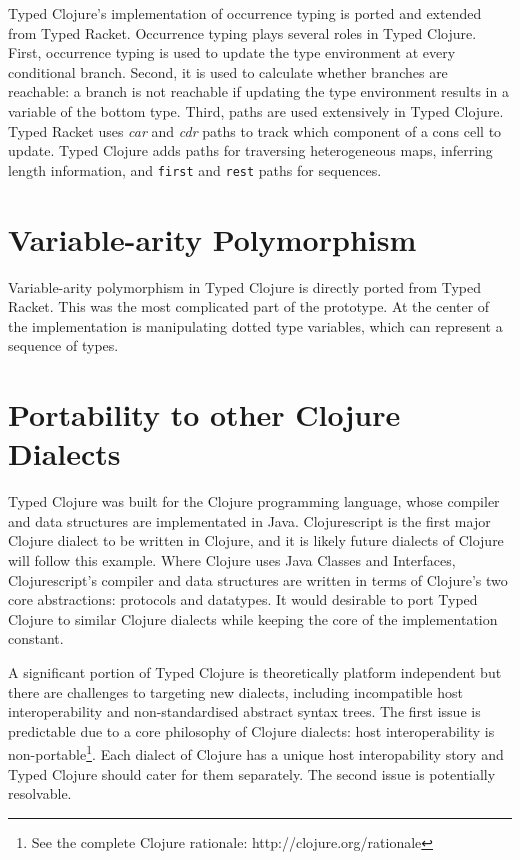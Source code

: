 Typed Clojure's implementation of occurrence typing is ported and extended from Typed Racket.
Occurrence typing plays several roles in Typed Clojure.
First, occurrence typing is used to update the type environment at every conditional branch.
Second, it is used to calculate whether branches are reachable: a branch is not reachable
if updating the type environment results in a variable of the bottom type.
Third, paths are used extensively in Typed Clojure. Typed Racket uses \emph{car} and \emph{cdr} paths
to track which component of a cons cell to update. Typed Clojure adds paths for traversing heterogeneous maps,
inferring length information, and \lstinline|first| and \lstinline|rest| paths for sequences.

\section{Variable-arity Polymorphism}

Variable-arity polymorphism in Typed Clojure is directly ported from Typed Racket.
This was the most complicated part of the prototype. At the center of the implementation
is manipulating dotted type variables, which can represent a sequence of types.

\section{Portability to other Clojure Dialects}

Typed Clojure was built for the Clojure programming language, whose compiler
and data structures are implementated in Java. Clojurescript is the first major Clojure dialect
to be written in Clojure, and it is likely future dialects of Clojure will follow this example. 
Where Clojure uses Java Classes and Interfaces, 
Clojurescript's compiler and data structures are written in terms of Clojure's
two core abstractions: protocols and datatypes.
It would desirable to port Typed Clojure to similar  Clojure dialects while keeping
the core of the implementation constant.

A significant portion of Typed Clojure is theoretically platform independent but there are
challenges to targeting new dialects, including incompatible host interoperability and
non-standardised abstract syntax trees.
The first issue is predictable due to a core philosophy of Clojure dialects: 
host interoperability is non-portable\footnote{See the complete Clojure rationale: http://clojure.org/rationale}.
Each dialect of Clojure has a unique host interopability story and Typed Clojure should cater for them
separately.
The second issue is potentially resolvable. 

